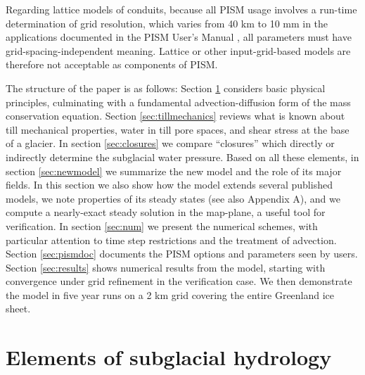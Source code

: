 \documentclass[gmd]{copernicus}   %
\begin{document}
Regarding lattice models of conduits, because all PISM usage involves a run-time determination of grid resolution, which varies from 40 km to 10 mm in the applications documented in the PISM User's Manual \citep{pism-user-manual}, all parameters must have grid-spacing-independent meaning.  Lattice or other input-grid-based models are therefore not acceptable as components of PISM.

The structure of the paper is as follows: Section \ref{sec:elements} considers basic physical principles, culminating with a fundamental advection-diffusion form of the mass conservation equation.  Section \ref{sec:tillmechanics} reviews what is known about till mechanical properties, water in till pore spaces, and shear stress at the base of a glacier.  In section \ref{sec:closures} we compare ``closures'' which directly or indirectly determine the subglacial water pressure.  Based on all these elements, in section \ref{sec:newmodel} we summarize the new model and the role of its major fields.  In this section we also show how the model extends several published models, we note properties of its steady states (see also Appendix A), and we compute a nearly-exact steady solution in the map-plane, a useful tool for verification.  In section \ref{sec:num} we present the numerical schemes, with particular attention to time step restrictions and the treatment of advection.  Section \ref{sec:pismdoc} documents the PISM options and parameters seen by users.  Section \ref{sec:results} shows numerical results from the model, starting with convergence under grid refinement in the verification case.  We then demonstrate the model in five year runs on a 2 km grid covering the entire Greenland ice sheet.


\section{Elements of subglacial hydrology} \label{sec:elements}
\end{document}
